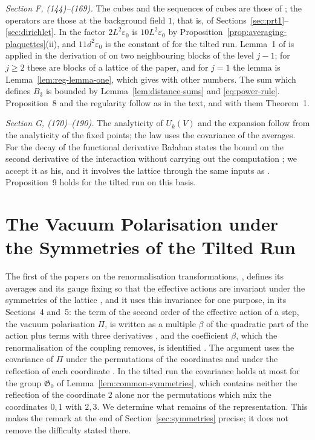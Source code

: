 \documentclass[11pt]{preprint}
\numberwithin{equation}{section}
\theoremstyle{definition}
\theoremstyle{remark}
\theoremstyle{plain}
\begin{document}
\emph{Section F, (144)--(169).} The cubes and the sequences of cubes are those of \cite[Section~F]{BalabanREG}; the operators are those at the background field $1$, that is, of Sections~\ref{sec:prt1}--\ref{sec:dirichlet}. In \cite[(145), (146)]{BalabanVAR} the factor $2L^2\varepsilon_0$ is $10L^2\varepsilon_0$ by Proposition~\ref{prop:averaging-plaquettes}(ii), and $11d^2\varepsilon_0$ is the constant of \cite[(1.65)]{BalabanREG} for the tilted run. Lemma~1 of \cite{BalabanREG} is applied in the derivation of \cite[(160)]{BalabanVAR} on two neighbouring blocks of the level $j - 1$; for $j \geq 2$ these are blocks of a lattice of the paper, and for $j = 1$ the lemma is Lemma~\ref{lem:reg-lemma-one}, which gives \cite[(160)]{BalabanVAR} with other numbers. The sum \cite[(161), (162)]{BalabanVAR} which defines $B_3$ is bounded by Lemma~\ref{lem:distance-sums} and \eqref{eq:power-rule}. Proposition~8 and the regularity \cite[(9), (10)]{BalabanVAR} follow as in the text, and with them Theorem~1.

\emph{Section G, (170)--(190).} The analyticity of $U_k(V)$ and the expansion \cite[(174)--(180)]{BalabanVAR} follow from the analyticity of the fixed points; the law \cite[(181)]{BalabanVAR} uses the covariance of the averages. For the decay \cite[(190)]{BalabanVAR} of the functional derivative Ba{\l}aban states the bound \cite[(189)]{BalabanVAR} on the second derivative of the interaction without carrying out the computation \cite[p.~308]{BalabanVAR}; we accept it as his, and it involves the lattice through the same inputs as \cite[(85)--(96)]{BalabanVAR}. Proposition~9 holds for the tilted run on this basis.

\section{The Vacuum Polarisation under the Symmetries of the Tilted Run}\label{sec:polarisation}

The first of the papers on the renormalisation transformations, \cite{BalabanRG1}, defines its averages and its gauge fixing so that the effective actions are invariant under the symmetries of the lattice \cite[pp.~252--254, 269]{BalabanRG1}, and it uses this invariance for one purpose, in its Sections~4 and~5: the term of the second order of the effective action of a step, the vacuum polarisation $\Pi$, is written as a multiple $\beta$ of the quadratic part of the action plus terms with three derivatives \cite[(5.37), (5.38), (5.43)]{BalabanRG1}, and the coefficient $\beta$, which the renormalisation of the coupling removes, is identified \cite[(5.42)]{BalabanRG1}. The argument uses the covariance of $\Pi$ under the permutations of the coordinates and under the reflection of each coordinate \cite[(5.6), (5.7)]{BalabanRG1}. In the tilted run the covariance holds at most for the group $\mathfrak G_0$ of Lemma~\ref{lem:common-symmetries}, which contains neither the reflection of the coordinate $2$ alone nor the permutations which mix the coordinates $0, 1$ with $2, 3$. We determine what remains of the representation. This makes the remark at the end of Section~\ref{sec:symmetries} precise; it does not remove the difficulty stated there.
\end{document}
